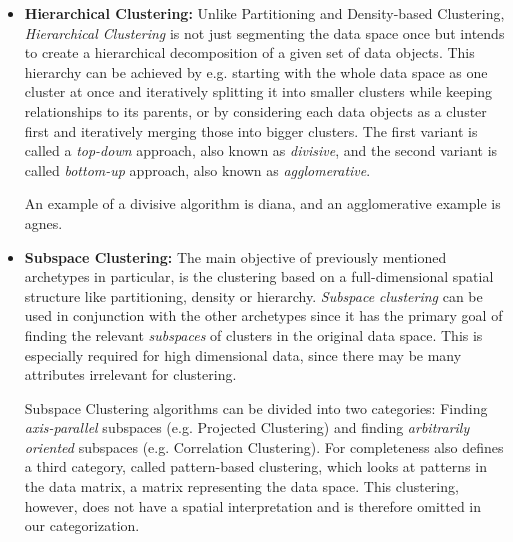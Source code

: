 \begin{itemize}
    \item \textbf{Hierarchical Clustering:} Unlike Partitioning and Density-based Clustering, \textit{Hierarchical Clustering} is not just segmenting the data space once but intends to create a hierarchical decomposition of a given set of data objects. This hierarchy can be achieved by e.g. starting with the whole data space as one cluster at once and iteratively splitting it into smaller clusters while keeping relationships to its parents, or by considering each data objects as a cluster first and iteratively merging those into bigger clusters. The first variant is called a \textit{top-down} approach, also known as \textit{divisive}, and the second variant is called \textit{bottom-up} approach, also known as \textit{agglomerative}\cite[Ch.10.3]{han2011data}. 
    
    An example of a divisive algorithm is \acrshort{diana}\cite[Ch.6]{kaufman2009finding}, and an agglomerative example is \acrshort{agnes}\cite[Ch.5]{kaufman2009finding}.
    
    
    \item \textbf{Subspace Clustering:} The main objective of previously mentioned archetypes in particular, is the clustering based on a full-dimensional spatial structure like partitioning, density or hierarchy. \textit{Subspace clustering} can be used in conjunction with the other archetypes since it has the primary goal of finding the relevant \textit{subspaces} of clusters in the original data space. This is especially required for high dimensional data, since there may be many attributes irrelevant for clustering\cite{vidal2011subspace}. 
    
    Subspace Clustering algorithms can be divided into two categories: Finding \textit{axis-parallel} subspaces (e.g. Projected Clustering) and finding \textit{arbitrarily oriented} subspaces (e.g. Correlation Clustering)\cite[Ch.3]{zimek2009correlation}.
    For completeness \textcite{zimek2009correlation} also defines a third category, called pattern-based clustering, which looks at patterns in the data matrix, a matrix representing the data space. This clustering, however, does not have a spatial interpretation and is therefore omitted in our categorization.
    

\end{itemize}
